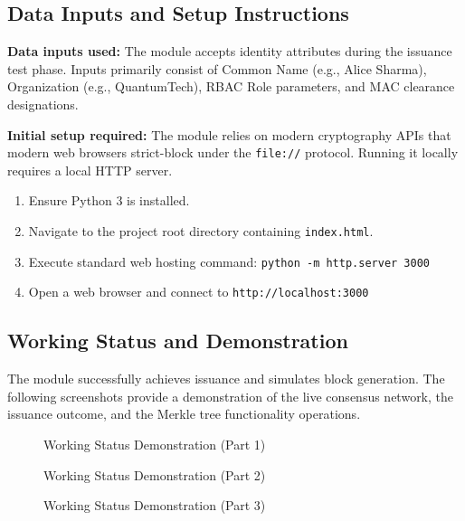 \documentclass[12pt,a4paper]{article}
\begin{document}
\subsection{Data Inputs and Setup Instructions}
\textbf{Data inputs used:} The module accepts identity attributes during the issuance test phase. Inputs primarily consist of Common Name (e.g., Alice Sharma), Organization (e.g., QuantumTech), RBAC Role parameters, and MAC clearance designations.

\textbf{Initial setup required:}
The module relies on modern cryptography APIs that modern web browsers strict-block under the \texttt{file://} protocol. Running it locally requires a local HTTP server.
\begin{enumerate}
    \item Ensure Python 3 is installed.
    \item Navigate to the project root directory containing \texttt{index.html}.
    \item Execute standard web hosting command: \texttt{python -m http.server 3000}
    \item Open a web browser and connect to \texttt{http://localhost:3000}
\end{enumerate}

\subsection{Working Status and Demonstration}

The module successfully achieves issuance and simulates block generation. 
The following screenshots provide a demonstration of the live consensus network, the issuance outcome, and the Merkle tree functionality operations.

\begin{figure}[!htbp]
    \centering
    \vspace{8cm} %
    \caption{Working Status Demonstration (Part 1)}
\end{figure}

\begin{figure}[!htbp]
    \centering
    \vspace{8cm} %
    \caption{Working Status Demonstration (Part 2)}
\end{figure}

\begin{figure}[!htbp]
    \centering
    \vspace{8cm} %
    \caption{Working Status Demonstration (Part 3)}
\end{figure}
\end{document}
